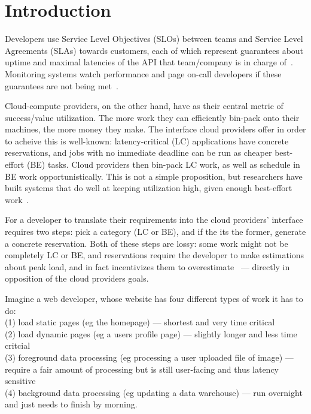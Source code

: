 \section{Introduction}

Developers use Service Level Objectives (SLOs) between teams and Service Level
Agreements (SLAs) towards customers, each of which represent guarantees about
uptime and maximal latencies of the API that team/company is in charge
of~\cite{awssla}. Monitoring systems watch performance and page on-call
developers if these guarantees are not being met~\cite{cloudwatch}.

Cloud-compute providers, on the other hand, have as their central metric of
success/value utilization. The more work they can efficiently bin-pack onto
their machines, the more money they make. The interface cloud providers offer in
order to acheive this is well-known: latency-critical (LC) applications have
concrete reservations, and jobs with no immediate deadline can be run as cheaper
best-effort (BE) tasks. Cloud providers then bin-pack LC work, as well as
schedule in BE work opportunistically. This is not a simple proposition, but
researchers have built systems that do well at keeping utilization high, given
enough best-effort work~\cite{caladan}.


For a developer to translate their requirements into the cloud providers'
interface requires two steps: pick a category (LC or BE), and if the its the
former, generate a concrete reservation. Both of these steps are lossy: some
work might not be completely LC or BE, and reservations require the developer to
make estimations about peak load, and in fact incentivizes them to
overestimate~\cite*{overprovision} --- directly in opposition of the cloud
providers goals.

Imagine a web developer, whose website has four different types of work it has
to do: \\
(1) load static pages (eg the homepage) --- shortest and very time critical \\
(2) load dynamic pages (eg a users profile page) --- slightly longer and less
time critcial \\
(3) foreground data processing (eg processing a user uploaded file of image) ---
require a fair amount of processing but is still user-facing and thus latency
sensitive \\
(4) background data processing (eg updating a data warehouse) --- run overnight
and just needs to finish by morning.

